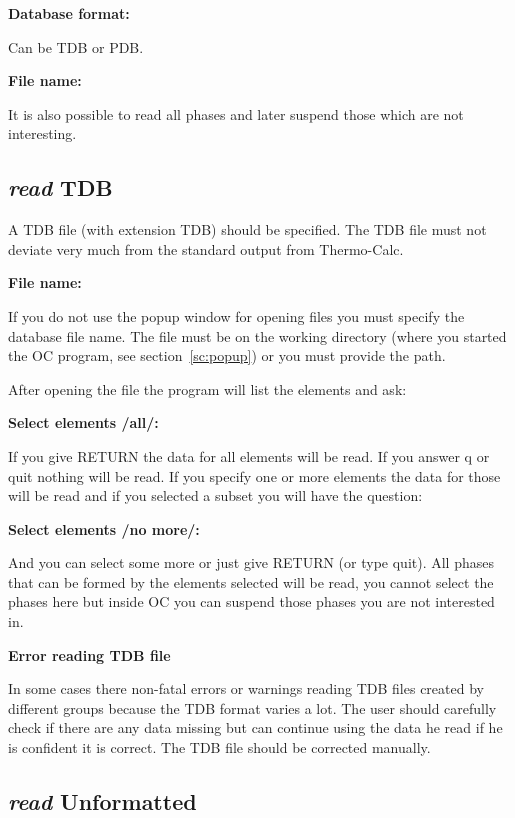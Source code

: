 \documentclass[11pt]{article}
\begin{document}
{\bf Database format:}

Can be TDB or PDB.

{\bf File name:}

It is also possible to read all phases and later suspend those which
are not interesting.

\hypertarget{Read TDB}{}
\hypertarget{Read tdb}{}
\subsection{{\em read} TDB}

A TDB file (with extension TDB) should be specified.  The TDB file
must not deviate very much from the standard output from Thermo-Calc.

\hypertarget{File name:}{{\bf File name:}}

If you do not use the popup window for opening files you must specify
the database file name.  The file must be on the working directory
(where you started the OC program, see section~\ref{sc:popup}) or you
must provide the path.

\hypertarget{Select element}{}
After opening the file the program will list the elements and ask:

{\bf Select elements /all/:}

If you give RETURN the data for all elements will be read.  If you
answer q or quit nothing will be read.  If you specify one or more
elements the data for those will be read and if you selected a subset
you will have the question:

{\bf Select elements /no more/:}

And you can select some more or just give RETURN (or type quit).  All
phases that can be formed by the elements selected will be read, you
cannot select the phases here but inside OC you can suspend those
phases you are not interested in.

\hypertarget{Read TDB error}{{\bf Error reading TDB file}}
  
In some cases there non-fatal errors or warnings reading TDB files
created by different groups because the TDB format varies a lot.  The
user should carefully check if there are any data missing but can
continue using the data he read if he is confident it is correct.  The
TDB file should be corrected manually.

\hypertarget{Read unformatted}{}
\subsection{{\em read} Unformatted}\label{sc:readunf}
\end{document}
